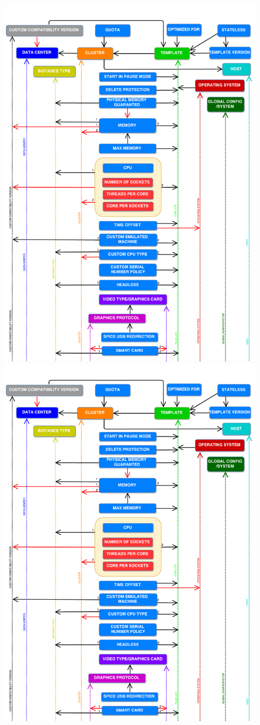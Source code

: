 \includegraphics[page=2, width=1.05\textwidth, angle=0]{DependencyGraph}
\newpage
\includegraphics[page=3, width=1.05\textwidth, angle=0]{DependencyGraph}
